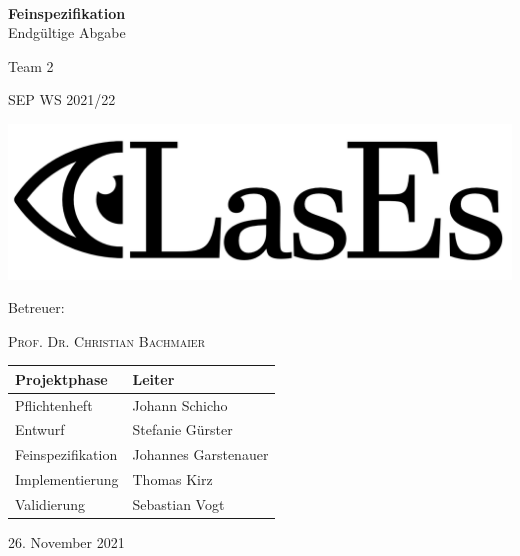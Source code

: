 \documentclass[a4paper,11pt]{article}
\begin{document}
    \begin{titlepage}
        \centering

        $~$

        \vspace{0.2cm} %

        \Huge \textbf{Feinspezifikation}\\
        \normalsize Endgültige Abgabe\vspace{0.5cm}

        \Huge Team 2
        \Large

        SEP WS 2021/22

        \vspace{2cm}

        \includegraphics[width=0.8\linewidth]{graphics/LasEs-logo}

        \vspace{2cm}

        Betreuer:

        \textsc{Prof. Dr. Christian Bachmaier}

        \vspace{1cm}

        \begin{table}[H]
            \centering
            \Large
            \begin{tabular}{ll}
                \toprule
                \textbf{Projektphase} & \textbf{Leiter} \\
                \midrule
                Pflichtenheft & Johann Schicho \\
                Entwurf & Stefanie Gürster \\
                Feinspezifikation & Johannes Garstenauer \\
                Implementierung & Thomas Kirz \\
                Validierung & Sebastian Vogt \\
                \bottomrule
            \end{tabular}
        \end{table}

        \vspace{1cm}

        26. November 2021

    \end{titlepage}
\end{document}
